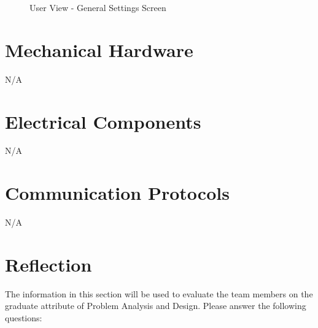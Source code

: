 \documentclass[12pt, titlepage]{article}
\begin{document}
\begin{figure}[hp!]
\begin{center}
    \caption{User View - General Settings Screen}
    \label{fig:settings}
    \end{center}
\end{figure}

\newpage 
\section{Mechanical Hardware}
N/A
\section{Electrical Components}
N/A
\section{Communication Protocols}
N/A
\section{Reflection}

The information in this section will be used to evaluate the team members on the
graduate attribute of Problem Analysis and Design.  Please answer the following
questions:
\end{document}
